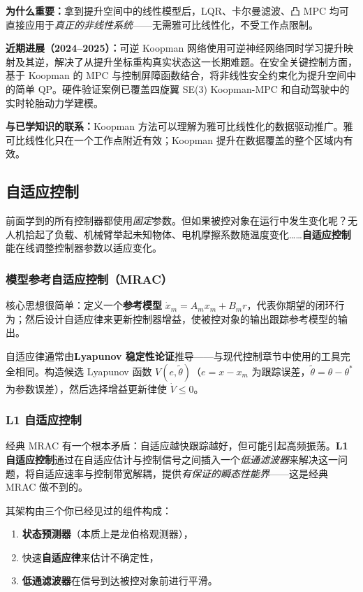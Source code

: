 \textbf{为什么重要：}拿到提升空间中的线性模型后，LQR、卡尔曼滤波、凸 MPC 均可直接应用于\emph{真正的非线性系统}——无需雅可比线性化，不受工作点限制。

\textbf{近期进展（2024--2025）：}可逆 Koopman 网络使用可逆神经网络同时学习提升映射及其逆，解决了从提升坐标重构真实状态这一长期难题。在安全关键控制方面，基于 Koopman 的 MPC 与控制屏障函数结合，将非线性安全约束化为提升空间中的简单 QP。硬件验证案例已覆盖四旋翼 SE(3) Koopman-MPC 和自动驾驶中的实时轮胎动力学建模。

\textbf{与已学知识的联系：}Koopman 方法可以理解为雅可比线性化的数据驱动推广。雅可比线性化只在一个工作点附近有效；Koopman 提升在数据覆盖的整个区域内有效。

\subsection{自适应控制}

前面学到的所有控制器都使用\emph{固定}参数。但如果被控对象在运行中发生变化呢？无人机拾起了负载、机械臂举起未知物体、电机摩擦系数随温度变化……\textbf{自适应控制}能在线调整控制器参数以适应变化。

\subsubsection{模型参考自适应控制（MRAC）}

核心思想很简单：定义一个\textbf{参考模型} $\dot{x}_m = A_m x_m + B_m r$，代表你期望的闭环行为；然后设计自适应律来更新控制器增益，使被控对象的输出跟踪参考模型的输出。

自适应律通常由\textbf{Lyapunov 稳定性论证}推导——与现代控制章节中使用的工具完全相同。构造候选 Lyapunov 函数 $V(e, \tilde{\theta})$（$e = x - x_m$ 为跟踪误差，$\tilde{\theta} = \theta - \theta^*$ 为参数误差），然后选择增益更新律使 $\dot{V} \leq 0$。

\subsubsection{L1 自适应控制}

经典 MRAC 有一个根本矛盾：自适应越快跟踪越好，但可能引起高频振荡。\textbf{L1 自适应控制}通过在自适应估计与控制信号之间插入一个\emph{低通滤波器}来解决这一问题，将自适应速率与控制带宽解耦，提供\emph{有保证的瞬态性能界}——这是经典 MRAC 做不到的。

其架构由三个你已经见过的组件构成：
\begin{enumerate}[nosep]
    \item \textbf{状态预测器}（本质上是龙伯格观测器），
    \item 快速\textbf{自适应律}来估计不确定性，
    \item \textbf{低通滤波器}在信号到达被控对象前进行平滑。
\end{enumerate}

